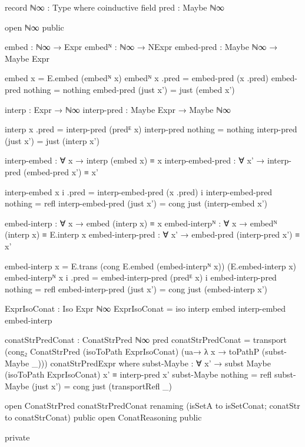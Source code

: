 \begin{code}[hide]
record ℕ∞ : Type where
  coinductive
  field pred : Maybe ℕ∞

open ℕ∞ public

embed : ℕ∞ → Expr
embedᴺ : ℕ∞ → NExpr
embed-pred : Maybe ℕ∞ → Maybe Expr

embed x = E.embed (embedᴺ x)
embedᴺ x .pred = embed-pred (x .pred)
embed-pred nothing = nothing
embed-pred (just x') = just (embed x')

interp : Expr → ℕ∞
interp-pred : Maybe Expr → Maybe ℕ∞

interp x .pred = interp-pred (predᴱ x)
interp-pred nothing = nothing
interp-pred (just x') = just (interp x')

interp-embed : ∀ x → interp (embed x) ≡ x
interp-embed-pred : ∀ x' → interp-pred (embed-pred x') ≡ x'

interp-embed x i .pred = interp-embed-pred (x .pred) i
interp-embed-pred nothing = refl
interp-embed-pred (just x') = cong just (interp-embed x')

embed-interp : ∀ x → embed (interp x) ≡ x
embed-interpᴺ : ∀ x → embedᴺ (interp x) ≡ E.interp x
embed-interp-pred : ∀ x' → embed-pred (interp-pred x') ≡ x'

embed-interp x = E.trans (cong E.embed (embed-interpᴺ x)) (E.embed-interp x)
embed-interpᴺ x i .pred = embed-interp-pred (predᴱ x) i
embed-interp-pred nothing = refl
embed-interp-pred (just x') = cong just (embed-interp x')

ExprIsoConat : Iso Expr ℕ∞
ExprIsoConat = iso interp embed interp-embed embed-interp

conatStrPredConat : ConatStrPred ℕ∞ pred
conatStrPredConat =
  transport
    (cong₂ ConatStrPred
      (isoToPath ExprIsoConat)
      (ua→ λ x → toPathP (subst-Maybe _)))
    conatStrPredExpr
  where
  subst-Maybe :
    ∀ x' → subst Maybe (isoToPath ExprIsoConat) x' ≡ interp-pred x'
  subst-Maybe nothing = refl
  subst-Maybe (just x') = cong just (transportRefl _)

open ConatStrPred conatStrPredConat
  renaming (isSetA to isSetConat; conatStr to conatStrConat) public
open ConatReasoning public

private
\end{code}

